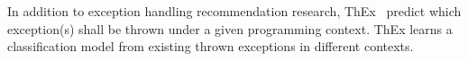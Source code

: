 In addition to exception handling recommendation research,
ThEx~\cite{thex-ase22} predict which exception(s) shall be thrown
under a given programming context. ThEx learns a classification model
from existing thrown exceptions in different contexts.


